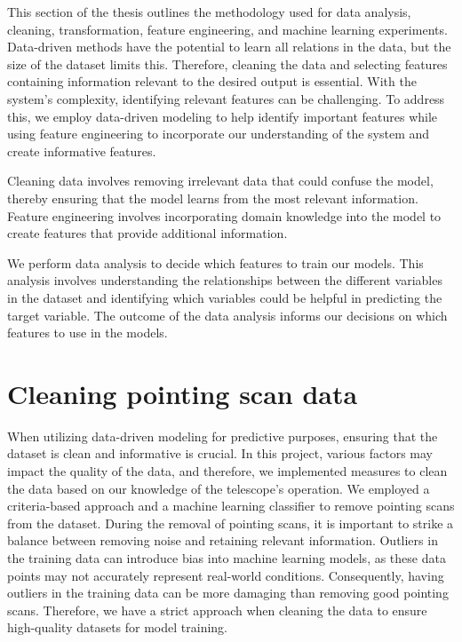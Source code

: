 
This section of the thesis outlines the methodology used for data analysis, cleaning, transformation, feature engineering, and machine learning experiments.
Data-driven methods have the potential to learn all relations in the data, but the size of the dataset limits this.
Therefore, cleaning the data and selecting features containing information relevant to the desired output is essential.
With the system's complexity, identifying relevant features can be challenging.
To address this, we employ data-driven modeling to help identify important features while using feature engineering to incorporate
our understanding of the system and create informative features.

Cleaning data involves removing irrelevant data that could confuse the model, thereby ensuring that the model learns from the most relevant information.
Feature engineering involves incorporating domain knowledge into the model to create features that provide additional information.

We perform data analysis to decide which features to train our models.
This analysis involves understanding the relationships between the different variables in the dataset and identifying which variables
could be helpful in predicting the target variable.
The outcome of the data analysis informs our decisions on which features to use in the models.


\section{Cleaning pointing scan data} \label{sec:cleaning_pt_scan}

When utilizing data-driven modeling for predictive purposes, ensuring that the dataset is clean and informative is crucial.
In this project, various factors may impact the quality of the data, and therefore, we implemented measures to clean the data based on our knowledge of the telescope's operation.
We employed a criteria-based approach and a machine learning classifier to remove pointing scans from the dataset.
During the removal of pointing scans, it is important to strike a balance between removing noise and retaining relevant information.
Outliers in the training data can introduce bias into machine learning models, as these data points may not accurately represent real-world conditions.
Consequently, having outliers in the training data can be more damaging than removing good pointing scans.
Therefore, we have a strict approach when cleaning the data to ensure high-quality datasets for model training.


